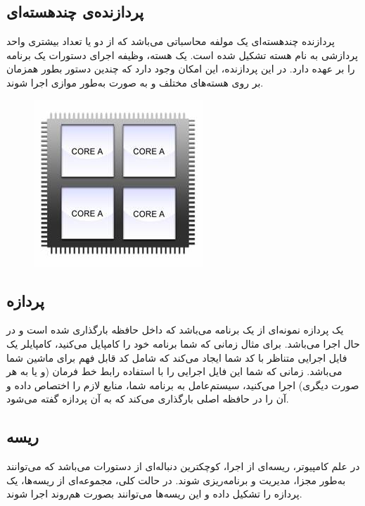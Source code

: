 \documentclass{utap}
\begin{document}
		\subsection{پردازنده‌ی چندهسته‌ای} %
		\hspace{5mm}
پردازنده چند‌هسته‌ای یک مولفه محاسباتی  می‌باشد که از دو یا تعداد بیشتری واحد پردازشی به نام هسته تشکیل شده است. یک هسته، وظیفه اجرای دستورات یک برنامه را بر عهده دارد. در این پردازنده، این امکان وجود دارد که چندین دستور بطور همزمان بر روی هسته‌های مختلف و به صورت به‌طور موازی اجرا شوند.
		\begin{figure}[H]
			\centering
			\includegraphics[width=0.30 \textwidth]{MultiCore.jpg}     
		\end{figure}
	
		\subsection{پردازه\protect{}} %
		\hspace{5mm}
	یک پردازه نمونه‌ای از یک برنامه می‌باشد که داخل حافظه بارگذاری شده است و در حال اجرا می‌باشد. برای مثال زمانی که شما برنامه‌ خود را کامپایل می‌کنید، کامپایلر یک فایل اجرایی متناظر با کد شما ایجاد می‌کند که شامل کد قابل فهم برای ماشین شما می‌باشد. زمانی که شما این فایل اجرایی را با استفاده رابط خط فرمان (و یا به هر صورت دیگری) اجرا می‌کنید،‌ سیستم‌عامل به برنامه شما، منابع لازم را اختصاص داده و آن را در حافظه اصلی بارگذاری می‌کند که به آن پردازه گفته می‌شود.

		\subsection{ریسه\protect{}} %
		\hspace{5mm}
	در علم کامپیوتر، ریسه‌ای از اجرا، کوچکترین دنباله‌ای از دستورات می‌باشد که می‌توانند به‌طور مجزا، مدیریت و برنامه‌ریزی شوند. در حالت کلی، مجموعه‌ای از ریسه‌ها، یک پردازه را تشکیل داده و این ریسه‌‌ها می‌توانند بصورت هم‌روند اجرا شوند.
	
\end{document}
